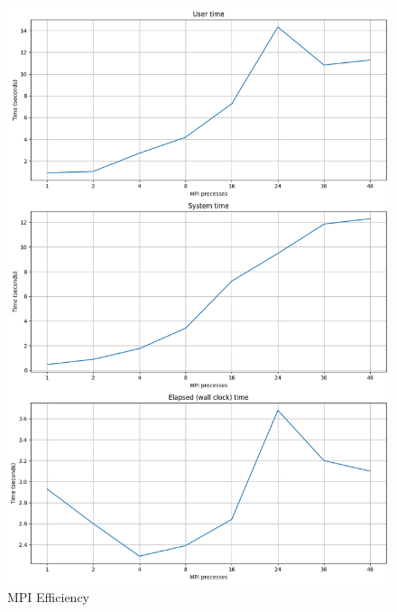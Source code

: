 \documentclass[
]{article}
\begin{document}
\begin{figure}
\centering
\includegraphics{figures/eff_mpi.png}
\caption{MPI Efficiency}
\end{figure}
\end{document}
